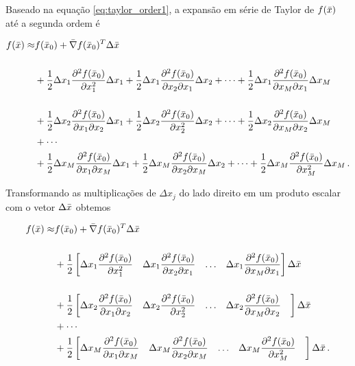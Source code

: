 Baseado na equação \ref{eq:taylor_order1}, a expansão em série de Taylor de
$f(\bar{x})$ até a segunda ordem é

\begin{equation}
\begin{split}
f(\bar{x}) \approx
&f(\bar{x}_0) + \bar{\nabla}f(\bar{x}_0)^T\Delta\bar{x}\
\\[0.5cm]
&+
\dfrac{1}{2}\Delta x_1\dfrac{\partial^2 f(\bar{x}_0)}{\partial x_1^2}\Delta x_1 +
\dfrac{1}{2}\Delta x_1\dfrac{\partial^2 f(\bar{x}_0)}{\partial x_2\partial x_1}\Delta x_2 +
\dotsb +
\dfrac{1}{2}\Delta x_1\dfrac{\partial^2 f(\bar{x}_0)}{\partial x_M\partial x_1}\Delta x_M 
\\[0.5cm]
&+
\dfrac{1}{2}\Delta x_2\dfrac{\partial^2 f(\bar{x}_0)}{\partial x_1\partial x_2}\Delta x_1 +
\dfrac{1}{2}\Delta x_2\dfrac{\partial^2 f(\bar{x}_0)}{\partial x_2^2}\Delta x_2 +
\dotsb +
\dfrac{1}{2}\Delta x_2\dfrac{\partial^2 f(\bar{x}_0)}{\partial x_M\partial x_2}\Delta x_M
\\
&+ \dotsb
\\
&+
\dfrac{1}{2}\Delta x_M\dfrac{\partial^2 f(\bar{x}_0)}{\partial x_1\partial x_M}\Delta x_1 +
\dfrac{1}{2}\Delta x_M\dfrac{\partial^2 f(\bar{x}_0)}{\partial x_2\partial x_M}\Delta x_2 +
\dotsb +
\dfrac{1}{2}\Delta x_M\dfrac{\partial^2 f(\bar{x}_0)}{\partial x_M^2}\Delta x_M
\thinspace .
\end{split}
\end{equation}

\noindent Transformando as multiplicações de $\Delta x_j$ do lado direito em
um produto escalar com o vetor $\Delta\bar{x}$ obtemos

\begin{equation}
\begin{split}
f(\bar{x}) \approx
&f(\bar{x}_0) + \bar{\nabla}f(\bar{x}_0)^T\Delta\bar{x}\
\\[0.5cm]
&+ \dfrac{1}{2}
\begin{bmatrix}
\Delta x_1\dfrac{\partial^2 f(\bar{x}_0)}{\partial x_1^2} &
\Delta x_1\dfrac{\partial^2 f(\bar{x}_0)}{\partial x_2\partial x_1} &
\ldots &
\Delta x_1\dfrac{\partial^2 f(\bar{x}_0)}{\partial x_M\partial x_1}
\end{bmatrix}
\Delta\bar{x}
\\[0.5cm]
&+ \dfrac{1}{2}
\begin{bmatrix}
\Delta x_2\dfrac{\partial^2 f(\bar{x}_0)}{\partial x_1\partial x_2} &
\Delta x_2\dfrac{\partial^2 f(\bar{x}_0)}{\partial x_2^2} &
\ldots &
\Delta x_2\dfrac{\partial^2 f(\bar{x}_0)}{\partial x_M\partial x_2} &
\end{bmatrix}
\Delta\bar{x}
\\
&+ \dotsb
\\
&+ \dfrac{1}{2}
\begin{bmatrix}
\Delta x_M\dfrac{\partial^2 f(\bar{x}_0)}{\partial x_1\partial x_M} &
\Delta x_M\dfrac{\partial^2 f(\bar{x}_0)}{\partial x_2\partial x_M} &
\ldots &
\Delta x_M\dfrac{\partial^2 f(\bar{x}_0)}{\partial x_M^2} &
\end{bmatrix}
\Delta\bar{x}
\thinspace .
\end{split}
\end{equation}

